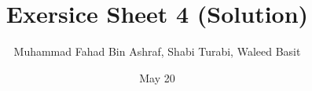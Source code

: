 \documentclass[12pt, a4paper]{article}
\title{Exersice Sheet 4 (Solution)}
\author{Muhammad Fahad Bin Ashraf, Shabi Turabi, Waleed Basit}
\date{May 20}
\begin{document}
 
\begin{titlepage}
\maketitle
\end{titlepage}

\end{document}
